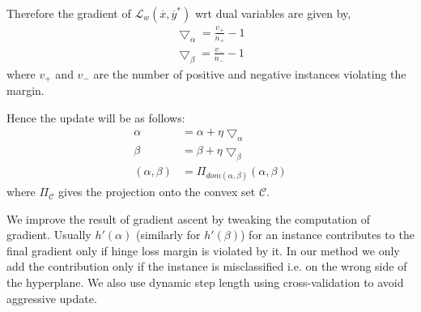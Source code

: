 \documentclass{article} %
\begin{document}
Therefore the gradient of $\mathcal L_w(\overline{x},\overline{y}^*)$ wrt dual variables are given by,
\begin{align*}
\bigtriangledown_\alpha =\frac{v_+}{n_+} - 1\\
\bigtriangledown_\beta =\frac{v_-}{n_-} - 1
\end{align*}
where $v_+$ and $v_-$ are the number of positive and negative instances violating the margin.

Hence the update will be as follows:
\begin{align*}
\alpha &= \alpha + \eta \bigtriangledown_\alpha\\
\beta &= \beta + \eta \bigtriangledown_\beta\\
(\alpha,\beta) &= \Pi_{dom(\alpha,\beta)}(\alpha,\beta)
\end{align*}
where $\Pi_\mathcal{C}$ gives the projection onto the convex set $\mathcal{C}$.

We improve the result of gradient ascent by tweaking the computation of gradient. Usually $h'(\alpha)$ (similarly for $h'(\beta)$) for an instance contributes to the final gradient only if hinge loss margin is violated by it. In our method we only add the contribution only if the instance is misclassified i.e. on the wrong side of the hyperplane. We also use dynamic step length using cross-validation to avoid aggressive update.
\end{document}
